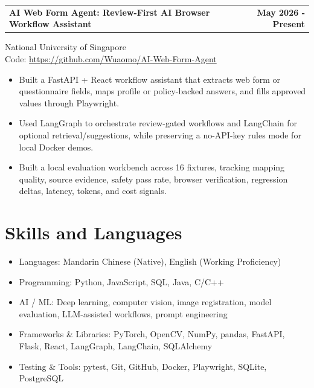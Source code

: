 \documentclass[11pt]{article}
\makeatletter
\newcommand{\projectEntry}[4]{
  \begin{tabularx}{\textwidth}{@{}Xr@{}}
    {\bfseries #1} & {\bfseries #2} \\
  \end{tabularx}
  #3\\
  Code: \href{#4}{#4}
}
\makeatother
\begin{document}
\vspace{0.10em}

\projectEntry
  {AI Web Form Agent: Review-First AI Browser Workflow Assistant}
  {May 2026 - Present}
  {National University of Singapore}
  {https://github.com/Wuaomo/AI-Web-Form-Agent}

\begin{itemize}
  \item Built a FastAPI + React workflow assistant that extracts web form or questionnaire fields, maps profile or policy-backed answers, and fills approved values through Playwright.
  \item Used LangGraph to orchestrate review-gated workflows and LangChain for optional retrieval/suggestions, while preserving a no-API-key rules mode for local Docker demos.
  \item Built a local evaluation workbench across 16 fixtures, tracking mapping quality, source evidence, safety pass rate, browser verification, regression deltas, latency, tokens, and cost signals.
\end{itemize}

\section*{Skills and Languages}

\begin{itemize}
  \item Languages: Mandarin Chinese (Native), English (Working Proficiency)
  \item Programming: Python, JavaScript, SQL, Java, C/C++
  \item AI / ML: Deep learning, computer vision, image registration, model evaluation, LLM-assisted workflows, prompt engineering
  \item Frameworks \& Libraries: PyTorch, OpenCV, NumPy, pandas, FastAPI, Flask, React, LangGraph, LangChain, SQLAlchemy
  \item Testing \& Tools: pytest, Git, GitHub, Docker, Playwright, SQLite, PostgreSQL
\end{itemize}
\end{document}
